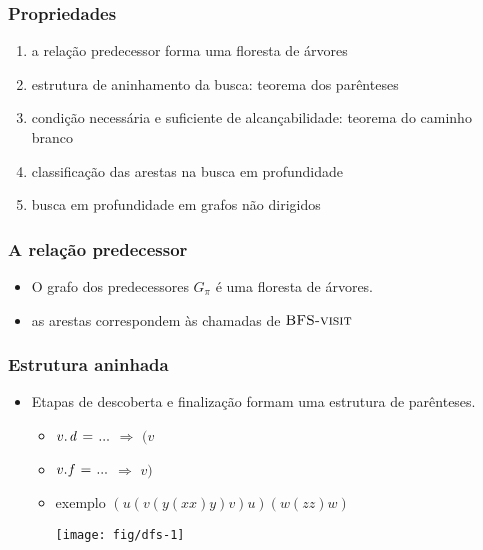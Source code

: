 \documentclass{beamer}
\begin{document}
\begin{frame}
\frametitle{Propriedades}

\begin{enumerate}
\item a relação predecessor forma uma floresta de árvores
\item estrutura de aninhamento da busca: teorema dos parênteses
\item condição necessária e suficiente de alcançabilidade: teorema do caminho branco
\item classificação das arestas na busca em profundidade
\item busca em profundidade em grafos não dirigidos
\end{enumerate}

\end{frame}

\begin{frame}
\frametitle{A relação predecessor}

\begin{itemize}
\item O grafo dos predecessores $G_\pi$ é uma floresta de árvores.

\item as arestas correspondem às chamadas de $\textnormal{\scshape BFS-visit}$

\end{itemize}

\end{frame}

\begin{frame}
\frametitle{Estrutura aninhada}

\begin{itemize}

\item Etapas de descoberta e finalização formam uma estrutura de parênteses.

\begin{itemize}

\item $\attrib{v}{d} \gets ...$ $\Longrightarrow$ $(v$

\item $\attrib{v}{f} \gets ...$ $\Longrightarrow$ $v)$

\item exemplo $(u (v (y (x x) y) v) u) (w (z z) w)$

\texttt{[image: fig/dfs-1]}

\end{itemize}

\end{itemize}

\end{frame}
\end{document}
